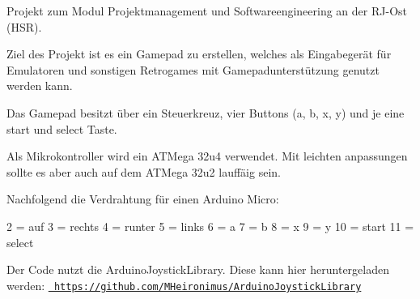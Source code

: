 Projekt zum Modul Projektmanagement und Softwareengineering an der R\+J-\/\+Ost (H\+SR).

Ziel des Projekt ist es ein Gamepad zu erstellen, welches als Eingabegerät für Emulatoren und sonstigen Retrogames mit Gamepadunterstützung genutzt werden kann.

Das Gamepad besitzt über ein Steuerkreuz, vier Buttons (a, b, x, y) und je eine start und select Taste.

Als Mikrokontroller wird ein A\+T\+Mega 32u4 verwendet. Mit leichten anpassungen sollte es aber auch auf dem A\+T\+Mega 32u2 lauffäig sein.

Nachfolgend die Verdrahtung für einen Arduino Micro\+:

2 = auf 3 = rechts 4 = runter 5 = links 6 = a 7 = b 8 = x 9 = y 10 = start 11 = select

Der Code nutzt die Arduino\+Joystick\+Library. Diese kann hier heruntergeladen werden\+: \href{https://github.com/MHeironimus/ArduinoJoystickLibrary}{\texttt{ https\+://github.\+com/\+M\+Heironimus/\+Arduino\+Joystick\+Library}} 